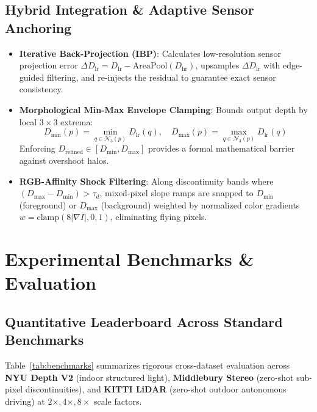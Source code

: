 \documentclass[10pt,a4paper]{article}
\begin{document}
\subsection{Hybrid Integration \& Adaptive Sensor Anchoring}
\begin{itemize}[leftmargin=*]
    \item \textbf{Iterative Back-Projection (IBP)}: Calculates low-resolution sensor projection error $\Delta D_{\text{lr}} = D_{\text{lr}} - \text{AreaPool}(D_{\text{hr}})$, upsamples $\Delta D_{\text{lr}}$ with edge-guided filtering, and re-injects the residual to guarantee exact sensor consistency.
    \item \textbf{Morphological Min-Max Envelope Clamping}: Bounds output depth by local $3\times 3$ extrema:
    \begin{equation}
        D_{\min}(p) = \min_{q \in \mathcal{N}_3(p)} D_{\text{lr}}(q), \quad D_{\max}(p) = \max_{q \in \mathcal{N}_3(p)} D_{\text{lr}}(q)
    \end{equation}
    Enforcing $D_{\text{refined}} \in [D_{\min}, D_{\max}]$ provides a formal mathematical barrier against overshoot halos.
    \item \textbf{RGB-Affinity Shock Filtering}: Along discontinuity bands where $(D_{\max} - D_{\min}) > \tau_d$, mixed-pixel slope ramps are snapped to $D_{\min}$ (foreground) or $D_{\max}$ (background) weighted by normalized color gradients $w = \text{clamp}(8|\nabla I|, 0, 1)$, eliminating flying pixels.
\end{itemize}

\section{Experimental Benchmarks \& Evaluation}

\subsection{Quantitative Leaderboard Across Standard Benchmarks}
Table~\ref{tab:benchmarks} summarizes rigorous cross-dataset evaluation across \textbf{NYU Depth V2} (indoor structured light), \textbf{Middlebury Stereo} (zero-shot sub-pixel discontinuities), and \textbf{KITTI LiDAR} (zero-shot outdoor autonomous driving) at $2\times, 4\times, 8\times$ scale factors.
\end{document}
